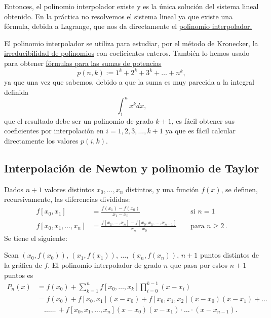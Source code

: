 Entonces, el polinomio interpolador existe y es la \'unica soluci\'on del
sistema lineal obtenido. En la pr\'actica no resolvemos el sistema lineal ya que
existe una f\'ormula, debida a Lagrange, que nos da directamente el
\href{http://en.wikipedia.org/wiki/Lagrange_polynomial}{polinomio
interpolador.}

\par
\medskip
\par

El polinomio interpolador se utiliza para estudiar, por el m\'etodo de
Kronecker, la \hyperref[kron]{irreducibilidad de polinomios} con coeficientes
enteros.  Tambi\'en lo hemos usado para obtener
\hyperref[ej-SumaCubos]{f\'ormulas para las sumas de potencias}
\[p(n,k):=1^k+2^k+3^k+\dots+n^k,\]
\noindent ya que una vez que sabemos, debido a que la suma es muy parecida a la
integral definida
\[\int_1^n x^k dx,\]
 \noindent que el resultado debe ser un polinomio de grado $k+1$, es f\'acil
obtener sus coeficientes por interpolaci\'on en $i=1,2,3,\dots,k+1$ ya que es
f\'acil calcular directamente los valores $p(i,k)$. 

\subsection{Interpolaci\'on de Newton y polinomio de Taylor}\label{dif-div}



Dados $n+1$ valores distintos $x_0,\dots,x_n$ distintos, y una función $f(x)$, 
se definen, recursivamente, las {\sc diferencias divididas}:
\begin{align*}
f[x_0,x_1] &=\frac{f(x_1)-f(x_0)}{x_1-x_0}
&&\text{ si }n=1\\
f[x_0,x_1,\dots,x_n]&=
\frac
{f[x_1,\dots,x_n]-f[x_0,x_1,\dots,x_{n-1}]}
{x_n-x_0}&&\text{ para }n\ge2\,.
\end{align*}
Se tiene el siguiente:
\begin{tma}\label{difgral}
Sean $(x_0,f(x_0))$, $(x_1,f(x_1))$, $\dots$, $(x_n,f(x_n))$, $n+1$
puntos distintos de la gráfica de $f$. El polinomio interpolador de
grado $n$ que pasa por estos $n+1$ puntos es
\begin{align*}
P_n(x) & =f(x_0)+\sum_{k=1}^n f[x_0,\dots,x_k]\prod_{i=0}^{k-1}(x-x_{i})
\\
&=
f(x_0)+f[x_0,x_1](x-x_0)
+f[x_0,x_1,x_2](x-x_0)(x-x_1)+\dots\\
&  \quad\dots\dots\,+
f[x_0,x_1,\dots,x_n](x-x_0)(x-x_1)\cdot
\dots\cdot(x-x_{n-1}).
\end{align*}
\end{tma}

